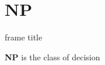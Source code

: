 \documentclass[xcolor=dvipsnames, aspectratio=169, 10pt]{beamer}
\begin{document}
\TitlePage
\SectionPage
\SubsectionPage
\ProgressBar
\PageNumbering
\section{NP}
\begin{frame}{frame title}
	\begin{mydefinition}
	\textbf{NP} is the class of decision
	\end{mydefinition}
\end{frame}
\end{document}
